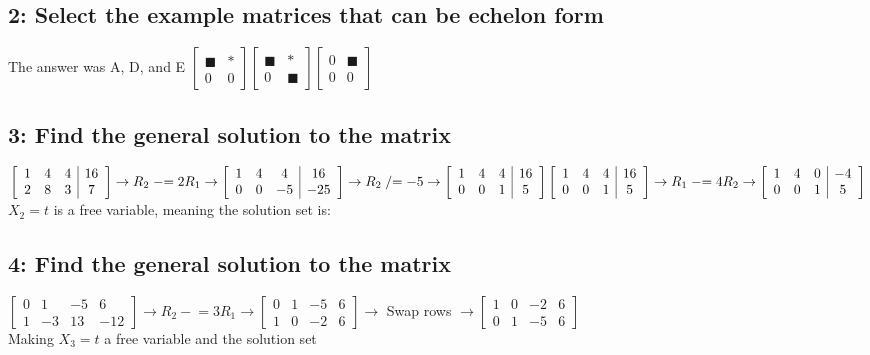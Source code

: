 \documentclass{article}
\begin{document}
\subsection*{2: Select the example matrices that can be echelon form}
The answer was A, D, and E 
$\left[\begin{array}{cc} \blacksquare & * \\ 0 & 0 \end{array}\right] \left[ \begin{array}{cc} \blacksquare & * \\ 0 & \blacksquare \end{array}\right] \left[\begin{array}{cc} 0 & \blacksquare  \\ 0 & 0 \end{array}\right]$
\subsection*{3: Find the general solution to the matrix}
$\left[\begin{array}{ccc|c}
1&4&4&16\\
2&8&3&7
\end{array}\right] \rightarrow R_2 \mathrel{-}= 2R_1\rightarrow 
\left[\begin{array}{ccc|c}
1&4&4&16\\
0&0&-5&-25
\end{array}\right]\rightarrow  R_2 \mathrel{/}= -5\rightarrow
\left[\begin{array}{ccc|c}
1&4&4&16\\
0&0&1&5
\end{array}\right]\\[3mm]
\left[\begin{array}{ccc|c}
1&4&4&16\\
0&0&1&5
\end{array}\right] \rightarrow R_1 \mathrel{-}=4R_2 \rightarrow
\left[\begin{array}{ccc|c}
1&4&0&-4\\
0&0&1&5
\end{array}\right] 
$\\[3mm] $X_2 = t$ is a free variable, meaning the solution set is: 
\subsection*{4: Find the general solution to the matrix}

$\left[\begin{array}{ccc|c}
    0&1&-5&6\\
    1&-3&13&-12
    \end{array}\right] \rightarrow R_2 \mathrel{-}=3R_1 \rightarrow
    \left[\begin{array}{ccc|c}
    0&1&-5&6\\
    1&0&-2&6
    \end{array}\right] \rightarrow$ Swap rows $\rightarrow
    \left[\begin{array}{ccc|c}
    1&0&-2&6\\
    0&1&-5&6
    \end{array}\right]$ \\[3mm] Making $X_3 = t$ a free variable and the solution set 
\end{document}
